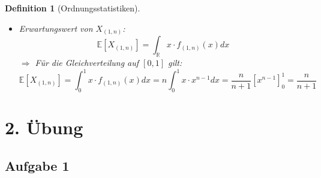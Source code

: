 \documentclass[12pt]{extreport} %
\newcommand{\R}{\mathbb{R}}
\theoremstyle{named}
\theoremstyle{itshape}
\newtheorem*{definition}{Definition}
\theoremstyle{normal}
\begin{document}
\begin{definition}[Ordnungsstatistiken]
\begin{itemize}
\begin{itemize}
\begin{align*}
						& \qquad + \begin{pmatrix} n \\2 \end{pmatrix} \cdot F(x)^{n-2} \cdot \left( 1- F(x) \right)^{2} \hspace{4.5cm} \\
						& \qquad \qquad \qquad \qquad \qquad \vdots \\
						& \qquad + \begin{pmatrix} n \\ n-1  \end{pmatrix}  \cdot F(x)^{n - (k-1)} \cdot \left( 1- F(x) \right)^{k-1} \\
						& = \sum_{j=0}^{k-1} \begin{pmatrix} n \\ j  \end{pmatrix} \cdot F(x)^{n-j} \cdot \left( 1 - F(x) \right)^{j}
					\end{align*}
			\end{itemize}
		\item Erwartungswert von $X_{(1,n)}$:
			$$ \mathds{E} [ X_{(1,n)} ] = \int_{\R} x \cdot f_{(1,n)}(x) dx $$
			$\Rightarrow$ Für die Gleichverteilung auf $[0,1]$ gilt:
			$$ \mathds{E}[X_{(1,n)}] = \int_{0}^1 x \cdot f_{(1,n)}(x) dx = n \int_0^1 x \cdot x^{n-1} dx = \frac{n}{n+1} \left[ x^{n-1} \right]_0^1 = \frac{n}{n+1} $$
	\end{itemize}
\end{definition}
	
	
\newpage

\section*{2. Übung}
 
\subsection*{Aufgabe 1}
\end{document}
